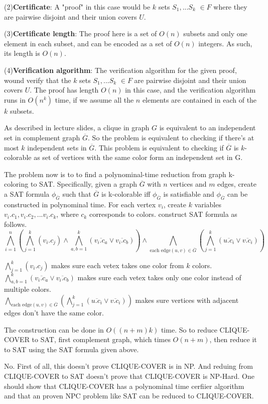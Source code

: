 \documentclass[12pt,a4paper]{article}
\newcommand{\question}[1]{\bigskip\noindent{\textbf{Q{#1} solution}}}
\begin{document}
(2)\textbf{Certificate}: A "proof" in this case would be $k$ sets $S_1, ... S_k$ $\in F$ where they are pairwise disjoint and their union covers $U$.

(3)\textbf{Certificate length}: The proof here is a set of $O(n)$ subsets and only one element in each subset, and can be encoded as a set of $O(n)$ integers. As such, its length is $O(n)$.

(4)\textbf{Verification algorithm}: The verification algorithm for the given proof, wound verify that the $k$ sets $S_1, ... S_k$ $\in F$ are pairwise disjoint and their union covers $U$.
The proof has length $O(n)$ in this case, and the verification algorithm runs in $O(n^k)$ time, if we assume all the $n$ elements are contained in each of the $k$ subsets.

\question{32.A}

As described in lecture slides, a clique in graph $G$ is equivalent to an independent set in complement graph $\overline{G}$. So the problem is equivalent to checking if there's at most $k$ independent sets in $\overline{G}$. This problem is equivalent to checking if $\overline{G}$ is $k$-colorable as set of vertices with the same color form an independent set in G. 

The problem now is to to find a polynominal-time reduction from graph k-coloring to SAT. Specifically, given a graph $\overline{G}$ with $n$ vertices and $m$ edges, create a SAT formula $\phi_{\overline{G}}$ such that $\overline{G}$ is k-colorable iff $\phi_{\overline{G}}$ is satisfiable and $\phi_{\overline{G}}$ can be constructed in polynominal time. For each vertex $v_i$, create $k$ variables $v_i.c_1,v_i.c_2,...v_i.c_k$, where $c_k$ corresponds to colors. construct SAT formula as follows.
\begin{equation*}
	\bigwedge_{i=1}^{n} (\bigwedge_{j=1}^{k}(v_i.c_j) \wedge \bigwedge_{a,b=1}^{k} (\overline{v_i.c_a} \vee \overline{v_i.c_b})) \wedge \bigwedge_{\mbox{each edge} (u,v) \in \overline{G}}( \bigwedge_{j=1}^{k}(\overline{u.c_i} \vee \overline{v.c_i}))
\end{equation*}

\noindent
$\bigwedge_{j=1}^{k}(v_i.c_j)$ makes sure each vetex takes one color from $k$ colors. \\
$\bigwedge_{a,b=1}^{k} (\overline{v_i.c_a} \vee \overline{v_i.c_b})$ makes sure each vetex takes only one color instead of multiple colors. \\
$\bigwedge_{\mbox{each edge} (u,v) \in \overline{G}}( \bigwedge_{j=1}^{k}(\overline{u.c_i} \vee \overline{v.c_i}))$ makes sure vertices with adjacent edges don't have the same color.

The construction can be done in $O((n+m)k)$ time. So to reduce CLIQUE-COVER to SAT, first complement graph, which times $O(n + m)$, then reduce it to SAT using the SAT formula given above.


\question{32.B}

No. First of all, this doesn't prove CLIQUE-COVER is in NP. And reduing from CLIQUE-COVER to SAT doesn't prove that CLIQUE-COVER is NP-Hard. One should show that CLIQUE-COVER has a polynominal time cerfiier algorithm and that an proven NPC problem like SAT can be reduced to CLIQUE-COVER.

\question{33}
\end{document}
